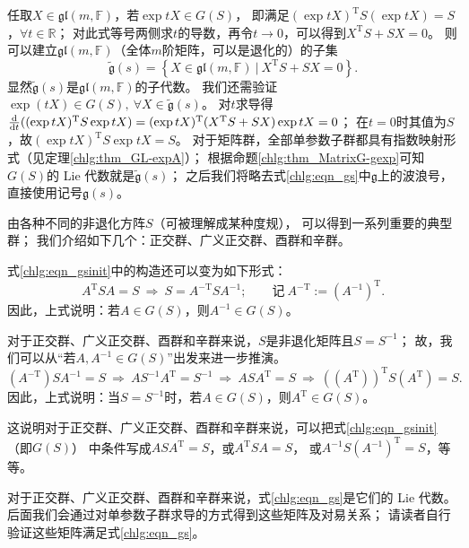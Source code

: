 任取$X\in \mathfrak{gl}(m,\mathbb{F})$，若$\exp tX \in G(S)$，
即满足$(\exp tX)^{\mathrm{T}} S (\exp t{X}) = S$，$ \forall t\in \mathbb{R} $；
对此式等号两侧求$t$的导数，再令$t\to 0$，可以得到$X^{\mathrm{T}} S + S {X} = 0 $。
则可以建立$\mathfrak{gl}(m,\mathbb{F})$（全体$m$阶矩阵，可以是退化的）的子集
\begin{equation} \label{chlg:eqn_gs}
    \tilde{\mathfrak{g}}(s) = \left\{ X \in \mathfrak{gl}(m,\mathbb{F}) \ |\
       X^{\mathrm{T}} S + S {X} = 0 \right\} .
\end{equation}
显然$\tilde{\mathfrak{g}}(s)$是$\mathfrak{gl}(m,\mathbb{F})$的子代数。
我们还需验证$\exp(tX)\in G(S),\ \forall X \in \tilde{\mathfrak{g}}(s)$。
对$t$求导得
$\frac{\dd}{\dd t}((\exp tX)^{\mathrm T}S\exp tX)
=(\exp tX)^{\mathrm T}(X^{\mathrm T}S+SX)\exp tX=0$；
在$t=0$时其值为$S$，故$(\exp tX)^{\mathrm T}S\exp tX=S$。
对于矩阵群，全部单参数子群都具有指数映射形式（见定理\ref{chlg:thm_GL-expA}）；
根据命题\ref{chlg:thm_MatrixG-gexp}可知$G(S)$的 Lie 代数就是$\tilde{\mathfrak{g}}(s)$；
之后我们将略去式\eqref{chlg:eqn_gs}中$\mathfrak{g}$上的波浪号，直接使用记号$\mathfrak{g}(s)$。

由各种不同的非退化方阵$S$（可被理解成某种度规），
可以得到一系列重要的典型群；
我们介绍如下几个：正交群、广义正交群、酉群和辛群。

式\eqref{chlg:eqn_gsinit}中的构造还可以变为如下形式：
\begin{equation}
    A^{\mathrm{T}} S {A} =S \ \Rightarrow \ S = A^{-\mathrm{T}} S {A^{-1}} ; \qquad
    \text{记}\  A^{-\mathrm{T}} := ({A^{-1}})^{\mathrm{T}} .
\end{equation}
因此，上式说明：若$A\in G(S)$，则$A^{-1} \in G(S)$。

对于正交群、广义正交群、酉群和辛群来说，$S$是非退化矩阵且$S=S^{-1}$；
故，我们可以从“若$A, A^{-1}\in G(S)$”出发来进一步推演。
\begin{equation*}
    (A^{-\mathrm{T}}) S {A^{-1}} =S \ \Rightarrow \
    {A} S^{-1} A^{\mathrm{T}} = S^{-1} \ \Rightarrow \ {A} S A^{\mathrm{T}} = S
    \ \Rightarrow \  \left({({A}^{\mathrm{T}})}\right)^{\mathrm{T}} S ({A}^{\mathrm{T}}) = S .
\end{equation*}
因此，上式说明：当$S=S^{-1}$时，若$A\in G(S)$，则${A}^{\mathrm{T}} \in G(S)$。

这说明对于正交群、广义正交群、酉群和辛群来说，可以把式\eqref{chlg:eqn_gsinit}（即$G(S)$）
中条件写成$ A S {A}^{\mathrm{T}} =S$，或$ {A}^{\mathrm{T}} S A =S$，
或$  A^{-1} S ({A^{-1}})^{\mathrm{T}} =S$，等等。

对于正交群、广义正交群、酉群和辛群来说，式\eqref{chlg:eqn_gs}是它们的 Lie 代数。
后面我们会通过对单参数子群求导的方式得到这些矩阵及对易关系；
请读者自行验证这些矩阵满足式\eqref{chlg:eqn_gs}。

